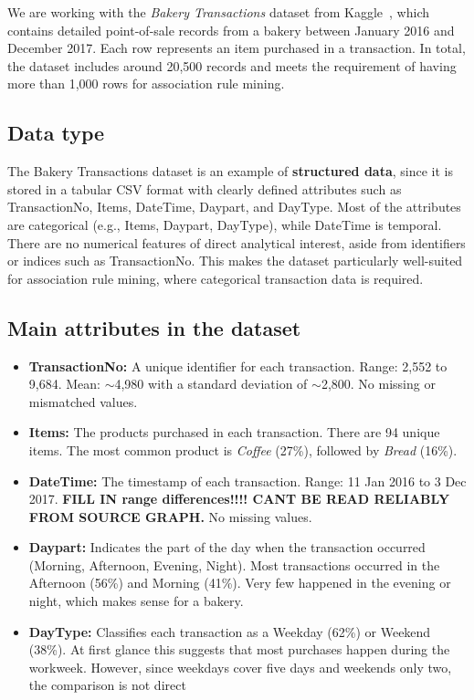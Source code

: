 \label{chap:data-understanding}

We are working with the \textit{Bakery Transactions} dataset from Kaggle~\cite{bakerydata}, which contains detailed point-of-sale records from a bakery between January 2016 and December 2017. 
Each row represents an item purchased in a transaction. 
In total, the dataset includes around 20,500 records and meets the requirement of having more than 1,000 rows for association rule mining.  

\subsection*{Data type}
The Bakery Transactions dataset is an example of \textbf{structured data}, 
since it is stored in a tabular CSV format with clearly defined attributes such as 
TransactionNo, Items, DateTime, Daypart, and DayType.  
Most of the attributes are categorical (e.g., Items, Daypart, DayType), 
while DateTime is temporal.  
There are no numerical features of direct analytical interest, aside from identifiers 
or indices such as TransactionNo.  
This makes the dataset particularly well-suited for association rule mining, 
where categorical transaction data is required.

\subsection*{Main attributes in the dataset}
\begin{itemize}
    \item \textbf{TransactionNo:} A unique identifier for each transaction.  
    Range: 2,552 to 9,684.  
    Mean: $\sim$4,980 with a standard deviation of $\sim$2,800.  
    No missing or mismatched values.  

    \item \textbf{Items:} The products purchased in each transaction.  
    There are 94 unique items.  
    The most common product is \textit{Coffee} (27\%), followed by \textit{Bread} (16\%).  

    \item \textbf{DateTime:} The timestamp of each transaction.  
    Range: 11 Jan 2016 to 3 Dec 2017.  
    \textbf{FILL IN range differences!!!! CANT BE READ RELIABLY FROM SOURCE GRAPH.}
    No missing values.  

    \item \textbf{Daypart:} Indicates the part of the day when the transaction occurred (Morning, Afternoon, Evening, Night).  
    Most transactions occurred in the Afternoon (56\%) and Morning (41\%).  
    Very few happened in the evening or night, which makes sense for a bakery.  

    \item \textbf{DayType:} Classifies each transaction as a Weekday (62\%) or Weekend (38\%).  
    At first glance this suggests that most purchases happen during the workweek. 
    However, since weekdays cover five days and weekends only two, the comparison is not direct

\end{itemize}

